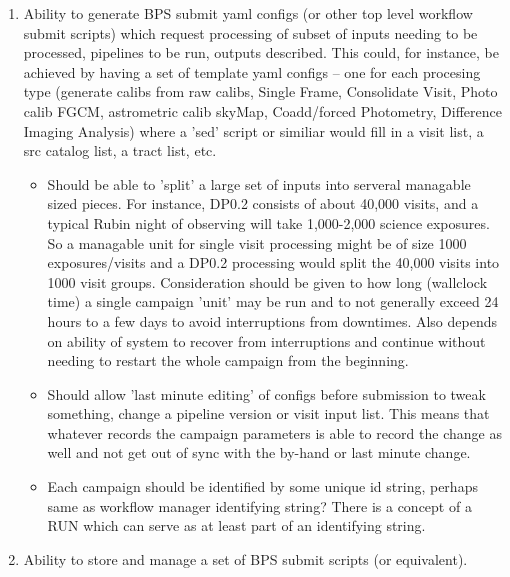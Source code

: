 \documentclass[DM,authoryear,toc]{lsstdoc}
\begin{document}
	\begin{enumerate}

	\item Ability to generate BPS submit yaml configs 
	(or other top level workflow submit scripts) which request processing
	of subset of inputs needing to be processed, pipelines to be run,
	outputs described.  This could, for instance, be achieved by having
	a set of template yaml configs -- one for each procesing type
	(generate calibs from raw calibs, Single Frame, Consolidate Visit, 
	Photo calib FGCM, astrometric calib skyMap, 
	Coadd/forced Photometry, Difference
	Imaging Analysis) where a 'sed' script or similiar would fill in
	a visit list, a src catalog list, a tract list, etc.

	\begin{itemize}

	\item Should be able to 'split' a large set of inputs into
	serveral managable sized pieces.  For instance, DP0.2 consists of
	about 40,000 visits, and a typical Rubin night of observing will
	take 1,000-2,000 science exposures.   So a managable unit for
	single visit processing might be of size 1000 exposures/visits and
	a DP0.2 processing would split the 40,000 visits into 1000 visit
	groups.  Consideration should be given to how long (wallclock time)
	a single campaign 'unit' may be run and to not generally exceed 
	24 hours to a few days to avoid interruptions from downtimes.
	Also depends on ability of system to recover from interruptions and
	continue without needing to restart the whole campaign from
	the beginning.
	

	\item  Should allow 'last minute editing' of configs before
	submission to tweak something, change a pipeline version or
	visit input list.  This means that whatever records the campaign
	parameters is able to record the change as well and not get
	out of sync with the by-hand or last minute change.

	\item Each campaign should be identified by some unique id string, 
	perhaps same as workflow manager identifying string?
	There is a concept of a RUN which can serve as at least part of an
	identifying string.

	\end{itemize}

	\item Ability to store and manage a set of BPS submit scripts 
	(or equivalent).


\end{enumerate}
\end{document}
